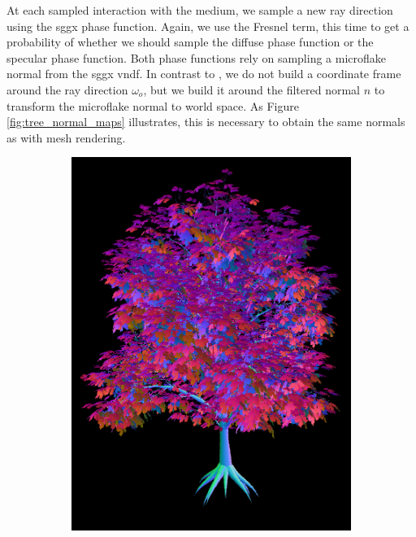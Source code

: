 At each sampled interaction with the medium, we sample a new ray direction using the \ac{sggx} phase function.
Again, we use the Fresnel term, this time to get a probability of whether we should sample the diffuse phase function or the specular phase function.
Both phase functions rely on sampling a microflake normal from the \ac{sggx} \acl{vndf}.
In contrast to \citeauthor{sggx} \cite{sggx}, we do not build a coordinate frame around the ray direction $\omega_o$, but we build it around the filtered normal $n$ to transform the microflake normal to world space.
As Figure \ref{fig:tree_normal_maps} illustrates, this is necessary to obtain the same normals as with mesh rendering.
\begin{figure}[t]
    \centering
    \begin{subfigure}[b]{0.3\linewidth}
        \centering
        \includegraphics[width=1\linewidth]{img/normal_map_mesh.png}

\end{subfigure}
\end{figure}
